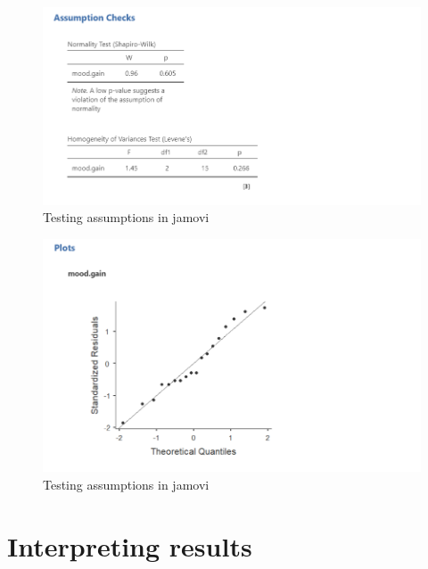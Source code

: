 \documentclass[
]{book}
\begin{document}
\begin{figure}

{\centering \includegraphics[width=1\linewidth]{images/04_one-way-anova/one-way_assumptions1} 

}

\caption{Testing assumptions in jamovi}\label{fig:unnamed-chunk-4}
\end{figure}

\begin{figure}

{\centering \includegraphics[width=1\linewidth]{images/04_one-way-anova/one-way_assumptions2} 

}

\caption{Testing assumptions in jamovi}\label{fig:unnamed-chunk-5}
\end{figure}

\hypertarget{interpreting-results-4}{%
\section{Interpreting results}\label{interpreting-results-4}}
\end{document}
